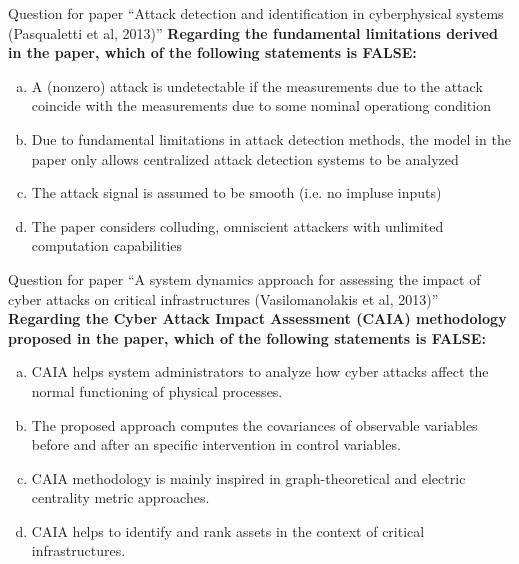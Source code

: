 \documentclass[compress]{beamer}
\begin{document}
\begin{frame}{Question for paper ``Attack detection and identification in
    cyberphysical systems (Pasqualetti et al, 2013)''}
    \textbf{Regarding the fundamental limitations derived in the paper, which of
the following statements is FALSE:}
      \begin{enumerate}[(a)]
       \item
           A (nonzero) attack is undetectable if the measurements due to the
           attack coincide with the measurements due to some nominal operationg
           condition
       \item
           Due to fundamental limitations in attack detection methods, the model
           in the paper only allows centralized attack detection systems to be
           analyzed
       \item
           The attack signal is assumed to be smooth (i.e. no impluse inputs)
       \item
           The paper considers colluding, omniscient attackers with unlimited
           computation capabilities
      \end{enumerate}
\end{frame}

\begin{frame}{Question for paper ``A system dynamics approach for assessing the impact of cyber attacks on critical infrastructures (Vasilomanolakis et al, 2013)''}
      \textbf{Regarding the Cyber Attack Impact Assessment (CAIA) methodology proposed in the paper, which of the following statements is FALSE:}
      \begin{enumerate}[(a)]
       \item CAIA helps system administrators to analyze how cyber attacks affect the normal functioning of physical processes.
       \item The proposed approach computes the covariances of observable variables before and after an specific intervention in control variables.
       \item CAIA methodology is mainly inspired in graph-theoretical and electric centrality metric approaches.
       \item CAIA helps to identify and rank assets in the context of critical infrastructures.
      \end{enumerate}
\end{frame}
\end{document}
